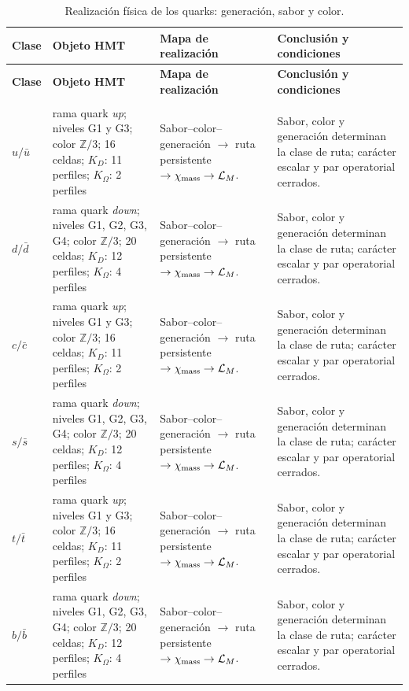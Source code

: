 \begingroup
\setlength{\tabcolsep}{4.5pt}
\renewcommand{\arraystretch}{1.28}
\begin{longtable}{@{}>{\raggedright\arraybackslash}p{}>{\raggedright\arraybackslash}p{}>{\raggedright\arraybackslash}p{}>{\raggedright\arraybackslash}p{}@{}}
\caption{Realización física de los quarks: generación, sabor y color.}\label{tab:masas-realizacion-quarks}\\
\toprule
\textbf{Clase} & \textbf{Objeto HMT} & \textbf{Mapa de realización} & \textbf{Conclusión y condiciones} \\
\midrule
\endfirsthead
\toprule
\textbf{Clase} & \textbf{Objeto HMT} & \textbf{Mapa de realización} & \textbf{Conclusión y condiciones} \\
\midrule
\endhead
\midrule
\multicolumn{4}{r}{\footnotesize Continúa en la página siguiente.}\\
\endfoot
\bottomrule
\endlastfoot
$u/\bar u$ & rama quark \emph{up}; niveles G1 y G3; color $\mathbb Z/3$; 16 celdas; $K_D$: 11 perfiles; $K_\Omega$: 2 perfiles & Sabor--color--generación $\to$ ruta persistente $\to\chi_{\rm mass}\to\mathcal L_M$. & Sabor, color y generación determinan la clase de ruta; carácter escalar y par operatorial cerrados. \\
$d/\bar d$ & rama quark \emph{down}; niveles G1, G2, G3, G4; color $\mathbb Z/3$; 20 celdas; $K_D$: 12 perfiles; $K_\Omega$: 4 perfiles & Sabor--color--generación $\to$ ruta persistente $\to\chi_{\rm mass}\to\mathcal L_M$. & Sabor, color y generación determinan la clase de ruta; carácter escalar y par operatorial cerrados. \\
$c/\bar c$ & rama quark \emph{up}; niveles G1 y G3; color $\mathbb Z/3$; 16 celdas; $K_D$: 11 perfiles; $K_\Omega$: 2 perfiles & Sabor--color--generación $\to$ ruta persistente $\to\chi_{\rm mass}\to\mathcal L_M$. & Sabor, color y generación determinan la clase de ruta; carácter escalar y par operatorial cerrados. \\
$s/\bar s$ & rama quark \emph{down}; niveles G1, G2, G3, G4; color $\mathbb Z/3$; 20 celdas; $K_D$: 12 perfiles; $K_\Omega$: 4 perfiles & Sabor--color--generación $\to$ ruta persistente $\to\chi_{\rm mass}\to\mathcal L_M$. & Sabor, color y generación determinan la clase de ruta; carácter escalar y par operatorial cerrados. \\
$t/\bar t$ & rama quark \emph{up}; niveles G1 y G3; color $\mathbb Z/3$; 16 celdas; $K_D$: 11 perfiles; $K_\Omega$: 2 perfiles & Sabor--color--generación $\to$ ruta persistente $\to\chi_{\rm mass}\to\mathcal L_M$. & Sabor, color y generación determinan la clase de ruta; carácter escalar y par operatorial cerrados. \\
$b/\bar b$ & rama quark \emph{down}; niveles G1, G2, G3, G4; color $\mathbb Z/3$; 20 celdas; $K_D$: 12 perfiles; $K_\Omega$: 4 perfiles & Sabor--color--generación $\to$ ruta persistente $\to\chi_{\rm mass}\to\mathcal L_M$. & Sabor, color y generación determinan la clase de ruta; carácter escalar y par operatorial cerrados. \\
\end{longtable}
\endgroup
